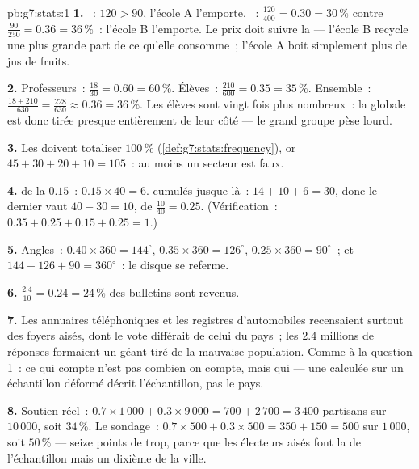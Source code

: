 \begin{solution}{pb:g7:stats:1}
\textbf{1.} ~: $120 > 90$, l'école A l'emporte.
~: $\frac{120}{400} = 0.30 = 30\,\%$ contre
$\frac{90}{250} = 0.36 = 36\,\%$~: l'école B l'emporte. Le prix doit
suivre la  --- l'école B recycle une plus grande part de ce
qu'elle consomme~; l'école A boit simplement plus de jus de fruits.

\textbf{2.} Professeurs~: $\frac{18}{30} = 0.60 = 60\,\%$. Élèves~:
$\frac{210}{600} = 0.35 = 35\,\%$. Ensemble~:
$\frac{18 + 210}{630} = \frac{228}{630} \approx 0.36 = 36\,\%$. Les
élèves sont vingt fois plus nombreux~: la  globale est donc
tirée presque entièrement de leur côté --- le grand groupe pèse
lourd.

\textbf{3.} Les  doivent totaliser $100\,\%$
(\cref{def:g7:stats:frequency}), or $45 + 30 + 20 + 10 = 105$~: au
moins un secteur est faux.

\textbf{4.}  de la  $0.15$~:
$0.15 \times 40 = 6$.  cumulés jusque-là~:
$14 + 10 + 6 = 30$, donc le dernier  vaut
$40 - 30 = 10$, de  $\frac{10}{40} = 0.25$. (Vérification~:
$0.35 + 0.25 + 0.15 + 0.25 = 1$.)

\textbf{5.} Angles~: $0.40 \times 360 = 144^\circ$,
$0.35 \times 360 = 126^\circ$, $0.25 \times 360 = 90^\circ$~; et
$144 + 126 + 90 = 360^\circ$~: le disque se referme.

\textbf{6.} $\frac{2.4}{10} = 0.24 = 24\,\%$ des bulletins sont
revenus.

\textbf{7.} Les annuaires téléphoniques et les registres
d'automobiles recensaient surtout des foyers aisés, dont le vote
différait de celui du pays~; les $2.4$ millions de réponses
formaient un  géant tiré de la mauvaise population. Comme à
la question 1~: ce qui compte n'est pas combien on compte, mais qui
--- une  calculée sur un échantillon déformé décrit
l'échantillon, pas le pays.

\textbf{8.} Soutien réel~:
$0.7 \times 1\,000 + 0.3 \times 9\,000 = 700 + 2\,700 = 3\,400$
partisans sur $10\,000$, soit $34\,\%$. Le sondage~:
$0.7 \times 500 + 0.3 \times 500 = 350 + 150 = 500$ sur $1\,000$,
soit $50\,\%$ --- seize points de trop, parce que les électeurs
aisés font la  de l'échantillon mais un dixième de la ville.


\end{solution}
